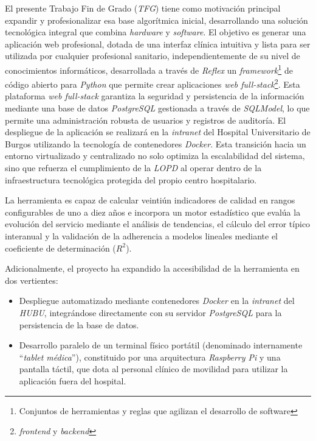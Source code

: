 El presente Trabajo Fin de Grado (\textit{TFG}) tiene como motivación principal expandir y profesionalizar esa base algorítmica inicial, desarrollando una solución tecnológica integral que combina \textit{hardware} y \textit{software}. El objetivo es generar una aplicación web profesional, dotada de una interfaz clínica intuitiva y lista para ser utilizada por cualquier profesional sanitario, independientemente de su nivel de conocimientos informáticos, desarrollada a través de \textit{Reflex} un \textit{framework}\footnote{Conjuntos de herramientas y reglas que agilizan el desarrollo de software} de código abierto para \textit{Python} que permite crear aplicaciones \textit{web full-stack}\footnote{\textit{frontend} y \textit{backend}}. Esta plataforma \textit{web full-stack} garantiza la seguridad y persistencia de la información mediante una base de datos \textit{PostgreSQL} gestionada a través de \textit{SQLModel}, lo que permite una administración robusta de usuarios y registros de auditoría. El despliegue  de la aplicación se realizará en la \textit{intranet} del Hospital Universitario de Burgos utilizando la tecnología de contenedores \textit{Docker}. Esta transición hacia un entorno virtualizado y centralizado no solo optimiza la escalabilidad del sistema, sino que refuerza el cumplimiento de la \textit{LOPD} \cite{boe2018/3} al operar dentro de la infraestructura tecnológica protegida del propio centro hospitalario.

La herramienta es capaz de calcular veintiún indicadores de calidad en rangos configurables de uno a diez años e incorpora un motor estadístico que evalúa la evolución del servicio mediante el análisis de tendencias, el cálculo del error típico interanual y la validación de la adherencia a modelos lineales mediante el coeficiente de determinación ($R^2$).

Adicionalmente, el proyecto ha expandido la accesibilidad de la herramienta en dos vertientes:
\begin{itemize}
    \item Despliegue automatizado mediante contenedores \textit{Docker} en la \textit{intranet} del \textit{HUBU}, integrándose directamente con su servidor \textit{PostgreSQL} para la persistencia de la base de datos.
    \item Desarrollo paralelo de un terminal físico portátil (denominado internamente ``\textit{tablet médica}''), constituido por una arquitectura \textit{Raspberry Pi} y una pantalla táctil, que dota al personal clínico de movilidad para utilizar la aplicación fuera del hospital.
\end{itemize}

